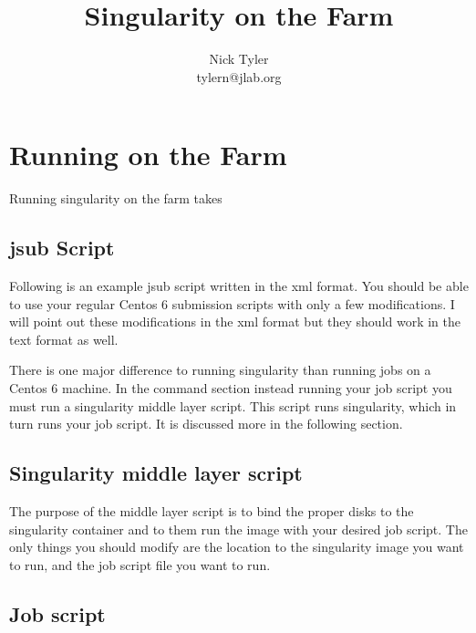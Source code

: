 \documentclass[12pt]{report}
\title{Singularity on the Farm}
\author{Nick Tyler \\ tylern@jlab.org}
\begin{document}
\maketitle

\section*{Running on the Farm}
Running singularity on the farm takes 

\subsection*{jsub Script}
\quad Following is an example jsub script written in the xml format. You should be able to use your regular Centos 6 submission scripts with only a few modifications. I will point out these modifications in the xml format but they should work in the text format as well.


There is one major difference to running singularity than running jobs on a Centos 6 machine. In the command section instead running your job script you must run a singularity middle layer script. This script runs singularity, which in turn runs your job script. It is discussed more in the following section.


\subsection*{Singularity middle layer script}
\quad The purpose of the middle layer script is to bind the proper disks to the singularity container and to them run the image with your desired job script. The only things you should modify are the location to the singularity image you want to run, and the job script file you want to run.



\subsection*{Job script}
\pagebreak


\end{document}
